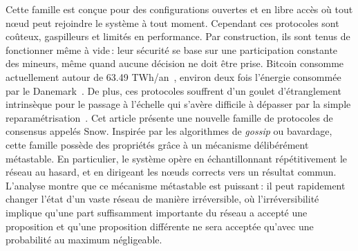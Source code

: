 \documentclass[a4,twocolumn,10pt]{article}
\theoremstyle{definition}
\begin{document}
Cette famille est conçue pour des configurations ouvertes et en libre accès où tout nœud peut rejoindre le système à tout moment.
Cependant ces protocoles sont coûteux, gaspilleurs et limités en performance.
Par construction, ils sont tenus de fonctionner même à vide\,: leur sécurité se base sur une participation constante des mineurs, même quand aucune décision ne doit être prise.
Bitcoin consomme actuellement autour de 63.49 TWh/an~\cite{bitcoinpower}, environ deux fois l'énergie consommée par le Danemark~\cite{denmarkpower}.
De plus, ces protocoles souffrent d'un goulet d'étranglement intrinsèque pour le passage à l'échelle qui s'avère difficile à dépasser par la simple reparamétrisation~\cite{CromanDEGJKMSSS16}.
Cet article présente une nouvelle famille de protocoles de consensus appelés Snow.
Ins\-pirée par les algorithmes de \emph{gossip} ou bavardage, cette famille possède des propriétés grâce à un mécanisme délibérément métastable.
En particulier, le système opère en échantillonnant répétitivement le réseau au hasard, et en dirigeant les nœuds corrects vers un résultat commun.
L'analyse montre que ce mécanisme métastable est puissant\,: il peut rapidement changer l'état d'un vaste réseau de manière irréversible, où l'irréversibilité implique qu'une part suffisamment importante du réseau a accepté une proposition et qu'une proposition différente ne sera acceptée qu'avec une probabilité au maximum négligeable.
\end{document}
